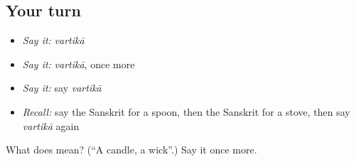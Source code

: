 \subsection*{Your turn}
\begin{itemize}
\raggedright
  \item \emph{Say it:} \emph{vartikā}
  \item \emph{Say it:} \emph{vartikā}, once more
  \item \emph{Say it:} say \emph{vartikā}
  \item \emph{Recall:} say the Sanskrit for a spoon, then the Sanskrit for a stove, then say \emph{vartikā} again
\end{itemize}

\begin{tcolorbox}[breakable,colback=teal!4,colframe=teal!35!black,title={Before you move on}]
What does  mean? (\textquotedblleft{}A candle, a wick\textquotedblright{}.) Say it once more.
\end{tcolorbox}
